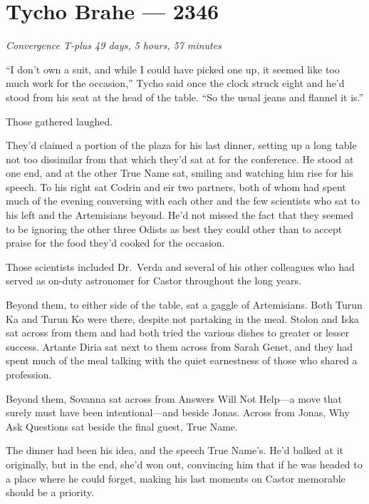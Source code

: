 \hypertarget{tycho-brahe-2346}{%
\chapter{Tycho Brahe — 2346}}

\begin{center}
\emph{Convergence T-plus 49 days, 5 hours, 57 minutes}
\end{center}

\noindent ``I don't own a suit, and while I could have picked one up, it seemed like too much work for the occasion,'' Tycho said once the clock struck eight and he'd stood from his seat at the head of the table. ``So the usual jeans and flannel it is.''

Those gathered laughed.

They'd claimed a portion of the plaza for his last dinner, setting up a long table not too dissimilar from that which they'd sat at for the conference. He stood at one end, and at the other True Name sat, smiling and watching him rise for his speech. To his right sat Codrin and eir two partners, both of whom had spent much of the evening conversing with each other and the few scientists who sat to his left and the Artemisians beyond. He'd not missed the fact that they seemed to be ignoring the other three Odists as best they could other than to accept praise for the food they'd cooked for the occasion.

Those scientists included Dr.~Verda and several of his other colleagues who had served as on-duty astronomer for Castor throughout the long years.

Beyond them, to either side of the table, sat a gaggle of Artemisians. Both Turun Ka and Turun Ko were there, despite not partaking in the meal. Stolon and Iska sat across from them and had both tried the various dishes to greater or lesser success. Artante Diria sat next to them across from Sarah Genet, and they had spent much of the meal talking with the quiet earnestness of those who shared a profession.

Beyond them, Sovanna sat across from Answers Will Not Help—a move that surely must have been intentional—and beside Jonas. Across from Jonas, Why Ask Questions sat beside the final guest, True Name.

The dinner had been his idea, and the speech True Name's. He'd balked at it originally, but in the end, she'd won out, convincing him that if he was headed to a place where he could forget, making his last moments on Castor memorable should be a priority.

